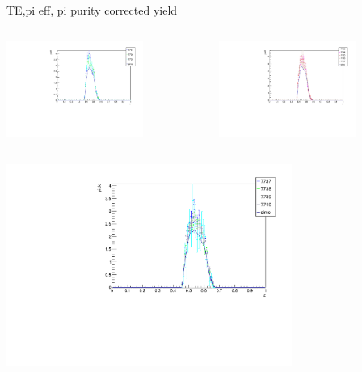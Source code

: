 \begin{frame}{TE,pi eff, pi purity corrected yield}
\begin{columns}
\begin{column}[T]{0.5\textwidth}
\includegraphics[width = 0.7\textwidth]{results/yield/check/yieldcheck_520_neg.pdf}
\end{column}
\begin{column}[T]{0.5\textwidth}
\includegraphics[width = 0.7\textwidth]{results/yield/check/yieldcheck_520_pos.pdf}
\end{column}
\end{columns}
\begin{columns}
\begin{column}[T]{0.5\textwidth}
\includegraphics[width = 0.7\textwidth]{results/yield/check/yieldcheck_510_neg.pdf}

\end{column}
\end{columns}
\end{frame}
